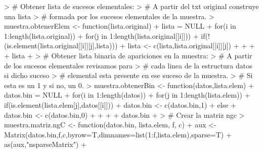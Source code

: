 \documentclass [a4paper] {article}
\begin{document}
\newpage

\begin{Schunk}
\begin{Sinput}
> # Obtener lista de sucesos elementales:
> # A partir del txt original construye una lista
> # formada por los sucesos elementales de la muestra.
> muestra.obtenerElem <- function(lista.original){
+ 	lista = NULL
+ 	for(i in 1:length(lista.original)){
+ 		for(j in 1:length(lista.original[[i]])){
+ 			if(!(is.element(lista.original[[i]][j],lista))){
+ 				lista <- c(lista,lista.original[[i]][j])
+ 			}
+ 		}
+ 	}
+ 	lista
+ }
> # Obtener lista binaria de apariciones en la muestra:
> # A partir de los sucesos elementales revisamos para
> # cada linea de la estructura datos si dicho suceso
> # elemental esta presente en ese suceso de la muestra.
> # Si esta es un 1 y si no, un 0.
> muestra.obtenerBin <- function(datos,lista.elem){
+ 	datos.bin = NULL
+ 	for(i in 1:length(datos)){
+ 		for(j in 1:length(lista.elem)){
+ 			if(is.element(lista.elem[j],datos[[i]])){
+ 				datos.bin <- c(datos.bin,1)
+ 			} else{
+ 				datos.bin <- c(datos.bin,0)
+ 			}
+ 		}
+ 	}
+ 	datos.bin
+ }
> # Crear la matriz ngc
> muestra.matriz.ngC <- function(datos.bin, lista.elem, f, c){
+ 	aux <- Matrix(datos.bin,f,c,byrow=T,dimnames=list(1:f,lista.elem),sparse=T)
+ 	as(aux,"nsparseMatrix")
+ }
\end{Sinput}
\end{Schunk}

\newpage
\end{document}
